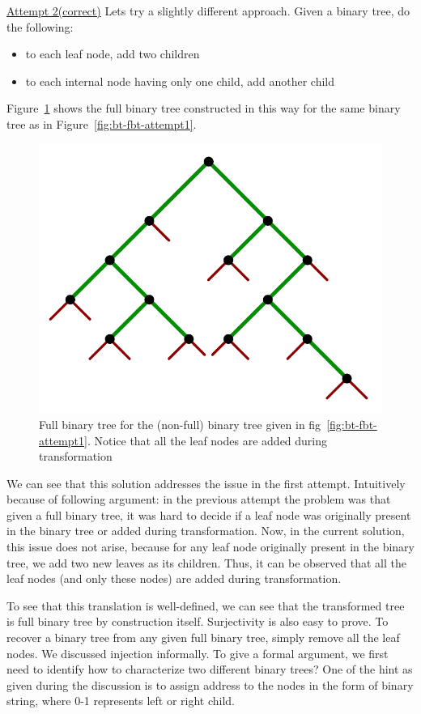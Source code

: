 \noindent\underline{Attempt 2(correct)}
Lets try a slightly different approach. Given a binary tree, do the following:
\begin{itemize}
    \item to each leaf node, add two children
    \item to each internal node having only one child, add another child
\end{itemize}
Figure~\ref{fig:binary-to-full-solution} shows the full binary tree constructed in this way for the same binary tree as in Figure~\ref{fig:bt-fbt-attempt1}.
\begin{figure}[h!]
    \centering
    \includegraphics[width=0.5\linewidth]{full-binary-3.png}
    \caption{Full binary tree for the (non-full) binary tree given in fig~\ref{fig:bt-fbt-attempt1}. Notice that all the leaf nodes are added during transformation}
    \label{fig:binary-to-full-solution}
\end{figure}
We can see that this solution addresses the issue in the first attempt. Intuitively because of following argument: in the previous attempt the problem was that given a full binary tree, it was hard to decide if a leaf node was originally present in the binary tree or added during transformation. Now, in the current solution, this issue does not arise, because for any leaf node originally present in the binary tree, we add two new leaves as its children. Thus, it can be observed that all the leaf nodes (and only these nodes) are added during transformation.

To see that this translation is well-defined, we can see that the transformed tree is full binary tree by construction itself. Surjectivity is also easy to prove. To recover a binary tree from any given full binary tree, simply remove all the leaf nodes. We discussed injection informally. To give a formal argument, we first need to identify how to characterize two different binary trees? One of the hint as given during the discussion is to assign address to the nodes in the form of binary string, where 0-1 represents left or right child. 

